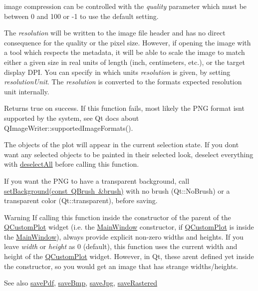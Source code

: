 image compression can be controlled with the {\itshape quality} parameter which must be between 0 and 100 or -\/1 to use the default setting.

The {\itshape resolution} will be written to the image file header and has no direct consequence for the quality or the pixel size. However, if opening the image with a tool which respects the metadata, it will be able to scale the image to match either a given size in real units of length (inch, centimeters, etc.), or the target display D\+PI. You can specify in which units {\itshape resolution} is given, by setting {\itshape resolution\+Unit}. The {\itshape resolution} is converted to the format\textquotesingle{}s expected resolution unit internally.

Returns true on success. If this function fails, most likely the P\+NG format isn\textquotesingle{}t supported by the system, see Qt docs about Q\+Image\+Writer\+::supported\+Image\+Formats().

The objects of the plot will appear in the current selection state. If you don\textquotesingle{}t want any selected objects to be painted in their selected look, deselect everything with \mbox{\hyperlink{class_q_custom_plot_a9d4808ab925b003054085246c92a257c}{deselect\+All}} before calling this function.

If you want the P\+NG to have a transparent background, call \mbox{\hyperlink{class_q_custom_plot_a8ed256cf467bfa7ba1f9feaae62c3bd0}{set\+Background(const Q\+Brush \&brush)}} with no brush (Qt\+::\+No\+Brush) or a transparent color (Qt\+::transparent), before saving.

\begin{DoxyWarning}{Warning}
If calling this function inside the constructor of the parent of the \mbox{\hyperlink{class_q_custom_plot}{Q\+Custom\+Plot}} widget (i.\+e. the \mbox{\hyperlink{class_main_window}{Main\+Window}} constructor, if \mbox{\hyperlink{class_q_custom_plot}{Q\+Custom\+Plot}} is inside the \mbox{\hyperlink{class_main_window}{Main\+Window}}), always provide explicit non-\/zero widths and heights. If you leave {\itshape width} or {\itshape height} as 0 (default), this function uses the current width and height of the \mbox{\hyperlink{class_q_custom_plot}{Q\+Custom\+Plot}} widget. However, in Qt, these aren\textquotesingle{}t defined yet inside the constructor, so you would get an image that has strange widths/heights.
\end{DoxyWarning}
\begin{DoxySeeAlso}{See also}
\mbox{\hyperlink{class_q_custom_plot_ad5acd34f6b39c3516887d7e54fec2412}{save\+Pdf}}, \mbox{\hyperlink{class_q_custom_plot_ae3a86ed0795670e50afa21759d4fa13d}{save\+Bmp}}, \mbox{\hyperlink{class_q_custom_plot_a76f0d278e630a711fa6f48048cfd83e4}{save\+Jpg}}, \mbox{\hyperlink{class_q_custom_plot_ad7723ce2edfa270632ef42b03a444352}{save\+Rastered}} 
\end{DoxySeeAlso}
\mbox{\label{class_q_custom_plot_ad7723ce2edfa270632ef42b03a444352}} 
